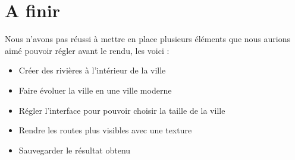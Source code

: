 \section{A finir}

Nous n'avons pas réussi à mettre en place plusieurs éléments que nous aurions aimé pouvoir régler avant le rendu, les voici :

\begin{itemize}
	\item Créer des rivières à l'intérieur de la ville
	\item Faire évoluer la ville en une ville moderne
	\item Régler l'interface pour pouvoir choisir la taille de la ville
	\item Rendre les routes plus visibles avec une texture
	\item Sauvegarder le résultat obtenu
\end{itemize}